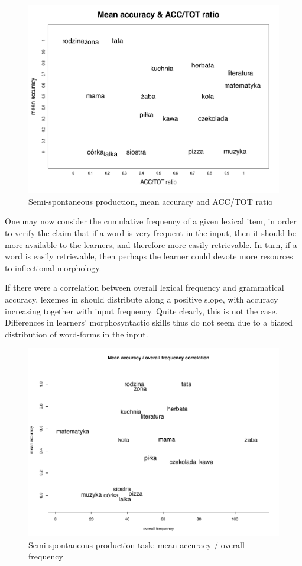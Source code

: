 \begin{figure}
    \includegraphics[width=\textwidth]{figures/07-1.pdf}
    \caption{Semi-spontaneous production, mean accuracy and ACC/TOT ratio}
    \label{fig:07:1}
\end{figure}

One may now consider the cumulative frequency of a given lexical item, in order to verify the claim that if a word is very frequent in the input, then it should be more available to the learners, and therefore more easily retrievable. In turn, if a word is easily retrievable, then perhaps the learner could devote more resources to inflectional morphology. 

If there were a correlation between overall lexical frequency and grammatical accuracy, lexemes in  should distribute along a positive slope, with accuracy increasing together with input frequency. Quite clearly, this is not the case. Differences in learners' morphosyntactic skills thus do not seem due to a biased distribution of word-forms in the input. 

\begin{figure}
    \includegraphics[width=\textwidth]{figures/07-2.pdf}
    \caption{Semi-spontaneous production task: mean accuracy / overall frequency}
    \label{fig:07:2}
\end{figure}

